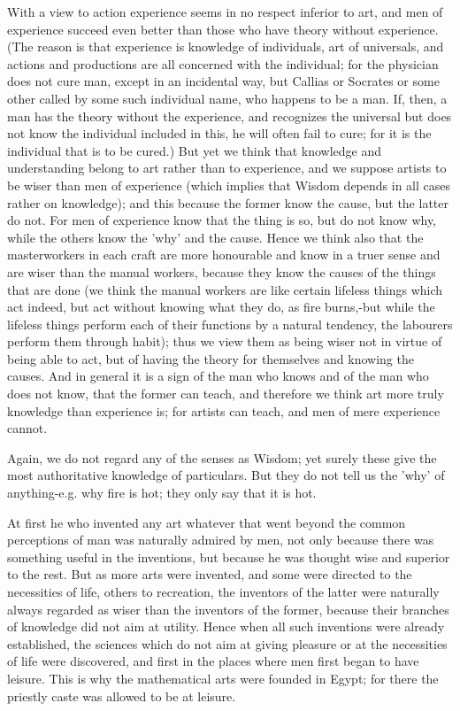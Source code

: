 \documentclass{article}
\begin{document}
With a view to action experience seems in no respect inferior to art, and men of experience succeed even better than those who have theory without experience. (The reason is that experience is knowledge of individuals, art of universals, and actions and productions are all concerned with the individual; for the physician does not cure man, except in an incidental way, but Callias or Socrates or some other called by some such individual name, who happens to be a man. If, then, a man has the theory without the experience, and recognizes the universal but does not know the individual included in this, he will often fail to cure; for it is the individual that is to be cured.) But yet we think that knowledge and understanding belong to art rather than to experience, and we suppose artists to be wiser than men of experience (which implies that Wisdom depends in all cases rather on knowledge); and this because the former know the cause, but the latter do not. For men of experience know that the thing is so, but do not know why, while the others know the 'why' and the cause. Hence we think also that the masterworkers in each craft are more honourable and know in a truer sense and are wiser than the manual workers, because they know the causes of the things that are done (we think the manual workers are like certain lifeless things which act indeed, but act without knowing what they do, as fire burns,-but while the lifeless things perform each of their functions by a natural tendency, the labourers perform them through habit); thus we view them as being wiser not in virtue of being able to act, but of having the theory for themselves and knowing the causes. And in general it is a sign of the man who knows and of the man who does not know, that the former can teach, and therefore we think art more truly knowledge than experience is; for artists can teach, and men of mere experience cannot.

Again, we do not regard any of the senses as Wisdom; yet surely these give the most authoritative knowledge of particulars. But they do not tell us the 'why' of anything-e.g. why fire is hot; they only say that it is hot.

At first he who invented any art whatever that went beyond the common perceptions of man was naturally admired by men, not only because there was something useful in the inventions, but because he was thought wise and superior to the rest. But as more arts were invented, and some were directed to the necessities of life, others to recreation, the inventors of the latter were naturally always regarded as wiser than the inventors of the former, because their branches of knowledge did not aim at utility. Hence when all such inventions were already established, the sciences which do not aim at giving pleasure or at the necessities of life were discovered, and first in the places where men first began to have leisure. This is why the mathematical arts were founded in Egypt; for there the priestly caste was allowed to be at leisure.
\end{document}
